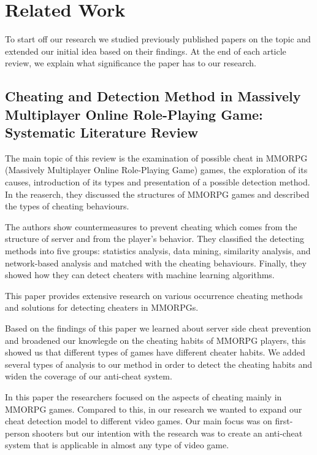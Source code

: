\section{Related Work}
\label{ch:lit_rev}

To start off our research we studied previously published papers on the topic and extended our initial idea based on their findings. At the end of each article review, we explain what significance the paper has to our research.

\subsection{Cheating and Detection Method in Massively Multiplayer Online Role-Playing Game: Systematic Literature Review \cite{9766355}}

The main topic of this review is the examination of possible cheat in MMORPG (Massively Multiplayer Online Role-Playing Game) games, the exploration of its causes, introduction of its types and presentation of a possible detection method.
In the reaserch, they discussed the structures of MMORPG games and described the types of cheating behaviours.

The authors show countermeasures to prevent cheating which comes from the structure of server and from the player's behavior.
They classified the detecting methods into five groups: statistics analysis, data mining, similarity analysis, and network-based analysis and matched with the cheating behaviours.
Finally, they showed how they can detect cheaters with machine learning algorithms.

This paper provides extensive research on various occurrence cheating methods and solutions for detecting cheaters in MMORPGs.

Based on the findings of this paper we learned about server side cheat prevention and broadened our knowlegde on the cheating habits of MMORPG players, this showed us that different types of games have different cheater habits. We added several types of analysis to our method in order to detect the cheating habits and widen the coverage of our anti-cheat system. 

In this paper the researchers focused on the aspects of cheating mainly in MMORPG games. Compared to this, in our research we wanted to expand our cheat detection model to different video games. Our main focus was on first-person shooters but our intention with the research was to create an anti-cheat system that is applicable in almost any type of video game.

